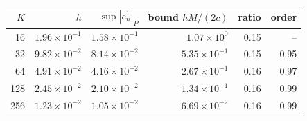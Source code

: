 \begin{tabular}{rrrrrr}
\toprule
$K$ & $h$ & $\sup|e^1_n|_P$ & bound $hM/(2c)$ & ratio & order\\
\midrule
16 & $1.96\times10^{-1}$ & $1.58\times10^{-1}$ & $1.07\times10^{0}$ & 0.15 & --\\
32 & $9.82\times10^{-2}$ & $8.14\times10^{-2}$ & $5.35\times10^{-1}$ & 0.15 & 0.95\\
64 & $4.91\times10^{-2}$ & $4.16\times10^{-2}$ & $2.67\times10^{-1}$ & 0.16 & 0.97\\
128 & $2.45\times10^{-2}$ & $2.10\times10^{-2}$ & $1.34\times10^{-1}$ & 0.16 & 0.99\\
256 & $1.23\times10^{-2}$ & $1.05\times10^{-2}$ & $6.69\times10^{-2}$ & 0.16 & 0.99\\
\bottomrule
\end{tabular}